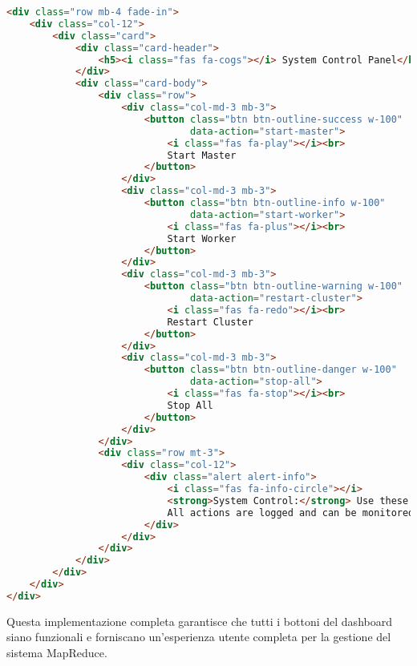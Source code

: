 \documentclass[12pt,a4paper]{article}
\begin{document}
\begin{lstlisting}[language=html, caption=Pannello Controllo Sistema]
<div class="row mb-4 fade-in">
    <div class="col-12">
        <div class="card">
            <div class="card-header">
                <h5><i class="fas fa-cogs"></i> System Control Panel</h5>
            </div>
            <div class="card-body">
                <div class="row">
                    <div class="col-md-3 mb-3">
                        <button class="btn btn-outline-success w-100" 
                                data-action="start-master">
                            <i class="fas fa-play"></i><br>
                            Start Master
                        </button>
                    </div>
                    <div class="col-md-3 mb-3">
                        <button class="btn btn-outline-info w-100" 
                                data-action="start-worker">
                            <i class="fas fa-plus"></i><br>
                            Start Worker
                        </button>
                    </div>
                    <div class="col-md-3 mb-3">
                        <button class="btn btn-outline-warning w-100" 
                                data-action="restart-cluster">
                            <i class="fas fa-redo"></i><br>
                            Restart Cluster
                        </button>
                    </div>
                    <div class="col-md-3 mb-3">
                        <button class="btn btn-outline-danger w-100" 
                                data-action="stop-all">
                            <i class="fas fa-stop"></i><br>
                            Stop All
                        </button>
                    </div>
                </div>
                <div class="row mt-3">
                    <div class="col-12">
                        <div class="alert alert-info">
                            <i class="fas fa-info-circle"></i>
                            <strong>System Control:</strong> Use these buttons to manage the MapReduce cluster. 
                            All actions are logged and can be monitored in real-time through the dashboard.
                        </div>
                    </div>
                </div>
            </div>
        </div>
    </div>
</div>
\end{lstlisting}

Questa implementazione completa garantisce che tutti i bottoni del dashboard siano funzionali e forniscano un'esperienza utente completa per la gestione del sistema MapReduce.
\end{document}
